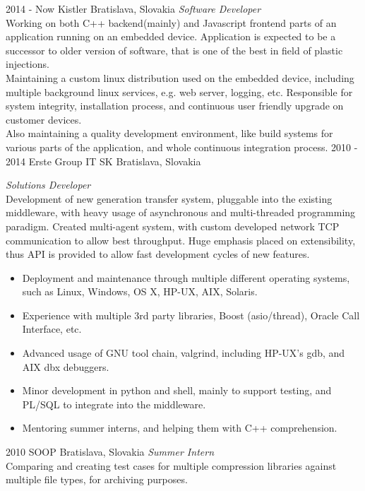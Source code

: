 \documentclass[]{friggeri-cv} %
\begin{document}
\begin{entrylist}
\entry
{2014 - Now}
{Kistler}
{Bratislava, Slovakia}
{\emph{Software Developer} \\
Working on both C++ backend(mainly) and Javascript frontend parts of an application running on an embedded device. 
Application is expected to be a successor to older version of software, that is one of the best in field of plastic injections.
\\
Maintaining a custom linux distribution used on the embedded device, including multiple background linux services, e.g. web server, logging, etc.
Responsible for system integrity, installation process, and continuous user friendly upgrade on customer devices.
\\
Also maintaining a quality development environment, like build systems for various parts of the application, and whole continuous integration process.
}
\entry
{2010 - 2014}
{Erste Group IT SK}
{Bratislava, Slovakia}
{\emph{Solutions Developer} \\
Development of new generation transfer system, pluggable into the existing middleware, with heavy usage of asynchronous and multi-threaded programming paradigm. Created multi-agent system, with custom developed network TCP communication to allow best throughput. Huge emphasis placed on extensibility, thus API is provided to allow fast development cycles of new features.

\begin{itemize}
\item Deployment and maintenance through multiple different operating systems, such as Linux, Windows, OS X, HP-UX, AIX, Solaris.
\item Experience with multiple 3rd party libraries, Boost (asio/thread), Oracle Call Interface, etc. 
\item Advanced usage of GNU tool chain, valgrind, including HP-UX's gdb, and AIX dbx debuggers. 
\item Minor development in python and shell, mainly to support testing, and PL/SQL to integrate into the middleware.

\item Mentoring summer interns, and helping them with C++ comprehension.
\end{itemize}}

\entry
{2010}
{SOOP}
{Bratislava, Slovakia}
{\emph{Summer Intern} \\
Comparing and creating test cases for multiple compression libraries against multiple file types, for archiving purposes.}
\end{entrylist}
\end{document}
